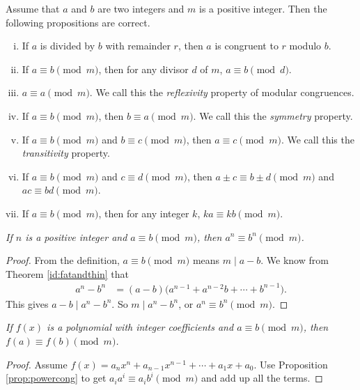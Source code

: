 \documentclass{subfile}
\begin{document}
	\begin{proposition}
		Assume that $a$ and $b$ are two integers and $m$ is a positive integer. Then the following propositions are correct.
			\begin{enumerate}[i.]
				\item If $a$ is divided by $b$ with remainder $r$, then $a$ is congruent to $r$ modulo $b$.
				\item If $a\equiv b\pmod m$, then for any divisor $d$ of $m$, $a\equiv b\pmod d$.
				\item $a \equiv a \pmod m$. We call this the \textit{reflexivity} property of modular congruences.
				\item If $a \equiv b \pmod m$, then $b \equiv a \pmod m$. We call this the \textit{symmetry} property.
				\item If $a \equiv b \pmod m$ and $b \equiv c \pmod m$, then $a \equiv c \pmod m$. We call this the \textit{transitivity} property.
				\item If $a \equiv b \pmod m$ and $c \equiv d \pmod m$, then $a\pm c \equiv b \pm d \pmod m$ and $ac \equiv bd \pmod m$.
				\item If $a \equiv b \pmod m$, then for any integer $k$, $ka \equiv kb \pmod m$.
			\end{enumerate}
	\end{proposition}
	
	\begin{proposition}\slshape\label{prop:powercong}
		If $n$ is a positive integer and $a \equiv b \pmod m$, then $a^n \equiv b^n \pmod m$.
	\end{proposition}
	
	\begin{proof}
		From the definition, $a \equiv b \pmod m$ means $m\mid a-b$. We know from Theorem \ref{id:fatandthin} that
		\begin{align*}
			a^n-b^n & = (a-b)\Big(a^{n-1}+a^{n-2}b+\cdots+b^{n-1}\Big).
		\end{align*}
		This gives $a-b\mid a^n-b^n$. So $m\mid a^n - b^n$, or $a^n \equiv b^n \pmod m$.
	\end{proof}	
	
	\begin{proposition}\slshape
		If $f(x)$ is a polynomial with integer coefficients and $a \equiv b \pmod m$, then $f(a) \equiv f(b) \pmod m$.
	\end{proposition}
	
	\begin{proof}
		Assume $f(x)=a_n x^n + a_{n-1} x^{n-1} + \cdots + a_1 x + a_0$. Use Proposition \eqref{prop:powercong} to get $a_i a^i \equiv a_i b^i \pmod m$ and add up all the terms.
	\end{proof}	
	
\end{document}
